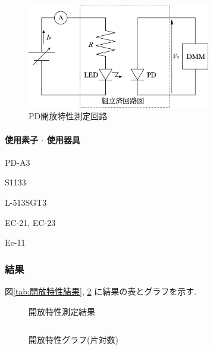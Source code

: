 \documentclass[titlepage]{jsarticle}
\begin{document}
            \begin{figure}[ht]
                \centering
                \includegraphics[width=8cm]{images/kaihou.eps}
                \caption{PD開放特性測定回路}
                \label{fig:開放特性回路}
            \end{figure}
            
            \paragraph{使用素子 $\cdot$ 使用器具}
                \begin{description}
                    \setlength{\leftskip}{1.5em}
                    \item[組立済回路] PD-A3
                    \item[PD] S1133
                    \item[LED] L-513SGT3
                    \item[デジタルマルチメータ] EC-21, EC-23
                    \item[直流電源] Ec-11
                \end{description}

        \subsubsection{結果}
            図\ref{tab:開放特性結果}, \ref{fig:開放特性グラフ}
            に結果の表とグラフを示す.

            \begin{figure}[ht]
                \def\@captype{table}
                \begin{minipage}{0.5\hsize}
                    \begin{center}
                        \caption{開放特性測定結果}
                        \label{tab:開放特性結果}
                        \begin{tabular}{c|c}
                            
                        \end{tabular}
                    \end{center}
                \end{minipage}
                \begin{minipage}{0.5\hsize}
                    \begin{center}
                        \caption{開放特性グラフ(片対数)}
                        \label{fig:開放特性グラフ}
                    \end{center}
                \end{minipage}
            \end{figure}
\end{document}
